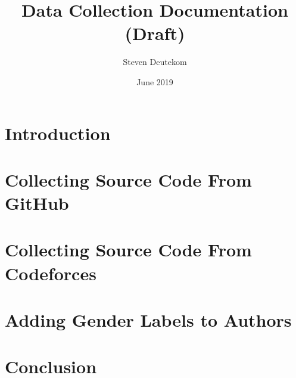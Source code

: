 \documentclass{article}
\begin{document}
\title{Data Collection Documentation (Draft)}
\author{Steven Deutekom}
\date{June 2019}
\maketitle


\newpage
\tableofcontents


\newpage
\section{Introduction}


\section{Collecting Source Code From GitHub}


\section{Collecting Source Code From Codeforces}


\section{Adding Gender Labels to Authors}


\section{Conclusion}
\end{document}
